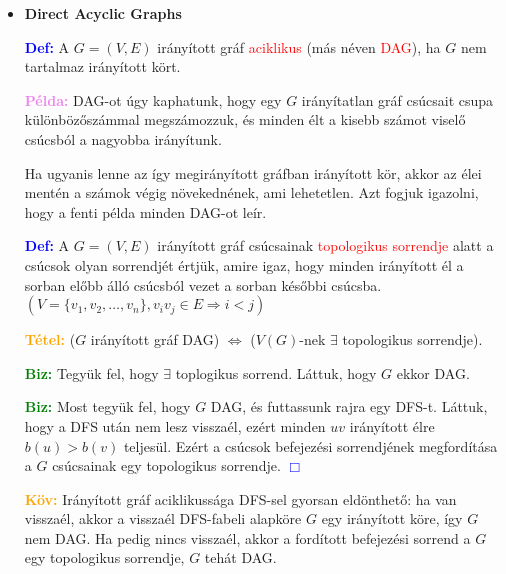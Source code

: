 \documentclass[../../szobeli.tex]{subfiles}
\begin{document}
\begin{center}
    \noindent{}
\end{center}

    \begin{itemize}
        \item \textbf{Direct Acyclic Graphs}

        \textcolor{blue}{\textbf{Def:}} A $G = (V,E)$ irányított gráf \textcolor{red}{aciklikus} (más néven \textcolor{red}{DAG}), ha $G$ nem tartalmaz irányított kört.

        \textcolor{violet}{\textbf{Példa:}} DAG-ot úgy kaphatunk, hogy egy $G$ irányítatlan gráf csúcsait csupa különbözőszámmal megszámozzuk, és minden élt a kisebb számot viselő csúcsból a nagyobba irányítunk.

        Ha ugyanis lenne az így megirányított gráfban irányított kör, akkor az élei mentén a számok végig növekednének, ami lehetetlen. Azt fogjuk igazolni, hogy a fenti példa minden DAG-ot leír.

        \textcolor{blue}{\textbf{Def:}} A $G = (V,E)$ irányított gráf csúcsainak \textcolor{red}{topologikus sorrendje} alatt a csúcsok olyan sorrendjét értjük, amire igaz, hogy minden irányított él a sorban előbb álló csúcsból vezet a sorban későbbi csúcsba. $(V=\{v_1,v_2,\dots,v_n\},v_iv_j \in E \Rightarrow i < j)$

        \textcolor{orange}{\textbf{Tétel:}} ($G$ irányított gráf DAG) $\Leftrightarrow$ ($V(G)$-nek $\exists$ topologikus sorrendje).

        \textcolor{green}{\textbf{Biz:}} Tegyük fel, hogy $\exists$ toplogikus sorrend. Láttuk, hogy $G$ ekkor DAG. \checkmark

        \textcolor{green}{\textbf{Biz:}} Most tegyük fel, hogy $G$ DAG, és futtassunk rajra egy DFS-t. Láttuk, hogy a DFS után nem lesz visszaél, ezért minden $uv$ irányított élre $b(u) > b(v)$ teljesül. Ezért a csúcsok befejezési sorrendjének megfordítása a $G$ csúcsainak egy topologikus sorrendje.  \textcolor{blue}{$\Box$} 

        \textcolor{orange}{\textbf{Köv:}} Irányított gráf aciklikussága DFS-sel gyorsan eldönthető: ha van visszaél, akkor a visszaél DFS-fabeli alapköre $G$ egy irányított köre, így $G$ nem DAG. Ha pedig nincs visszaél, akkor a fordított befejezési sorrend a $G$ egy topologikus sorrendje, $G$ tehát DAG.


\end{itemize}
\end{document}
